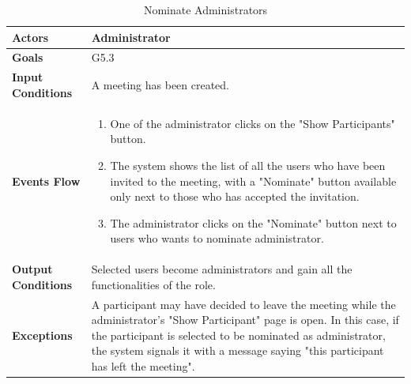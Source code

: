 \begin{table}[H]
	\centering
	\def\arraystretch{1.5}
	\begin{tabular}{|p{7cm}|p{7cm}|}
		\hline
		\textbf{Actors}            & Administrator    \\ \hline
		\textbf{Goals}             & G5.3           \\ \hline
		\textbf{Input Conditions}  & A meeting has been created.           \\ \hline
		\textbf{Events Flow}       &  
		\begin{enumerate}[topsep=0pt, leftmargin=*]
			\item One of the administrator clicks on the "Show Participants" button.
			\item The system shows the list of all the users who have been invited to the meeting, with a "Nominate" button available only next to those who has accepted the invitation.
			\item The administrator clicks on the "Nominate" button next to users who wants to nominate administrator.
		\end{enumerate}             \\ \hline
		\textbf{Output Conditions} & Selected users become administrators and gain all the functionalities of the role.           \\ \hline
		\textbf{Exceptions}        & A participant may have decided to leave the meeting while the administrator's "Show Participant" page is open. In this case, if the participant is selected to be nominated as administrator, the system signals it with a message saying "this participant has left the meeting".      \\ \hline
	\end{tabular}
	\caption{Nominate Administrators}
\end{table}


